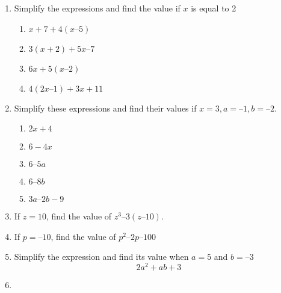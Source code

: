 \begin{enumerate}[label=\thesection.\arabic*, ref=\thesection.\theenumi]
\begin{enumerate}
\end{enumerate}
\item  Simplify the expressions and find the value if $x$ is equal to 2 
	\begin{enumerate}
\item $ x + 7 + 4 (x – 5)$
\item $ 3 (x + 2) + 5x – 7 $
\item $ 6x + 5 (x – 2) $
\item $ 4(2x – 1) + 3x + 11$
\end{enumerate}
\item  Simplify these expressions and find their values if $x = 3, a = – 1, b = – 2$. 
	\begin{enumerate}
\item $ 2x +4 $
\item $6 - 4x$
\item $6 – 5a $
\item $6 – 8b $
\item $3a – 2b-9 $
\end{enumerate}
\item If $z = 10$, find the value of $z^3 – 3(z – 10)$. 
\item  If $p = – 10$, find the value of $p^2 – 2p – 100$
\item  Simplify the expression and find its value when $a = 5$ and $b = – 3$
	$$ 2a^2 + ab + 3 $$
\item 		\end{enumerate}
